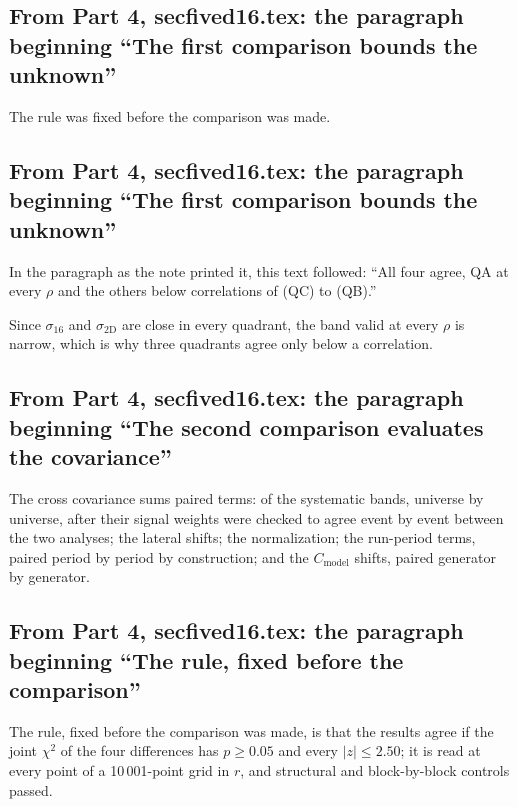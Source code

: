 \subsection{From Part 4, secfived16.tex: the paragraph beginning ``The first comparison bounds the unknown''}
The rule was fixed before the comparison was made.

\subsection{From Part 4, secfived16.tex: the paragraph beginning ``The first comparison bounds the unknown''}
In the paragraph as the note printed it, this text followed: ``All four agree, QA at every $\rho$ and the others below correlations of  (QC) to  (QB).''\par
Since $\sigma_{16}$ and $\sigma_{\mathrm{2D}}$ are close in every quadrant, the band valid at every $\rho$ is narrow, which is why three quadrants agree only below a correlation.

\subsection{From Part 4, secfived16.tex: the paragraph beginning ``The second comparison evaluates the covariance''}
The cross covariance sums paired terms:  of the  systematic bands, universe by universe, after their signal weights were checked to agree event by event between the two analyses; the  lateral shifts; the normalization; the run-period terms, paired period by period by construction; and the $C_{\mathrm{model}}$ shifts, paired generator by generator.

\subsection{From Part 4, secfived16.tex: the paragraph beginning ``The rule, fixed before the comparison''}
The rule, fixed before the comparison was made, is that the results agree if the joint $\chi^2$ of the four differences has $p\geq0.05$ and every $|z|\leq2.50$; it is read at every point of a 10\,001-point grid in $r$, and  structural and block-by-block controls passed.

